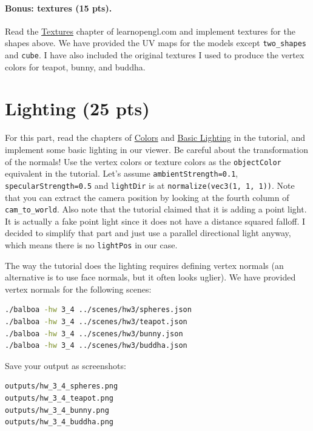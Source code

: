 \paragraph{Bonus: textures (15 pts).} Read the \href{https://learnopengl.com/Getting-started/Textures}{Textures} chapter of learnopengl.com and implement textures for the shapes above. We have provided the UV maps for the models except \lstinline{two_shapes} and \lstinline{cube}. I have also included the original textures I used to produce the vertex colors for teapot, bunny, and buddha.

\section{Lighting (25 pts)}
For this part, read the chapters of \href{https://learnopengl.com/Lighting/Colors}{Colors} and \href{https://learnopengl.com/Lighting/Basic-Lighting}{Basic Lighting} in the tutorial, and implement some basic lighting in our viewer. Be careful about the transformation of the normals! Use the vertex colors or texture colors as the \lstinline{objectColor} equivalent in the tutorial. Let's assume \lstinline{ambientStrength=0.1}, \lstinline{specularStrength=0.5} and \lstinline{lightDir} is at \lstinline{normalize(vec3(1, 1, 1))}. 
Note that you can extract the camera position by looking at the fourth column of \lstinline{cam_to_world}.
Also note that the tutorial claimed that it is adding a point light. It is actually a fake point light since it does not have a distance squared falloff. I decided to simplify that part and just use a parallel directional light anyway, which means there is no \lstinline{lightPos} in our case.

The way the tutorial does the lighting requires defining vertex normals (an alternative is to use face normals, but it often looks uglier). We have provided vertex normals for the following scenes:
\begin{lstlisting}[language=bash]
./balboa -hw 3_4 ../scenes/hw3/spheres.json
./balboa -hw 3_4 ../scenes/hw3/teapot.json
./balboa -hw 3_4 ../scenes/hw3/bunny.json
./balboa -hw 3_4 ../scenes/hw3/buddha.json
\end{lstlisting}

Save your output as screenshots:
\begin{lstlisting}[language=bash]
outputs/hw_3_4_spheres.png
outputs/hw_3_4_teapot.png
outputs/hw_3_4_bunny.png
outputs/hw_3_4_buddha.png
\end{lstlisting}

